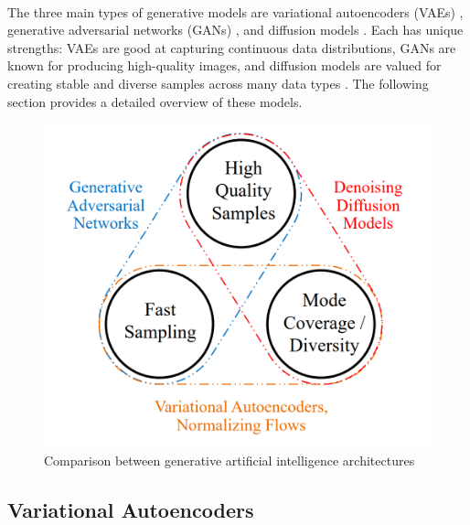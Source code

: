 \\
The three main types of generative models are variational autoencoders (VAEs) \cite{kingmaAutoEncodingVariationalBayes2013}, generative adversarial networks (GANs) \cite{goodfellowGenerativeAdversarialNetworks2014}, and diffusion models \cite{sohl-dicksteinDeepUnsupervisedLearning2015}. Each has unique strengths: VAEs are good at capturing continuous data distributions, GANs are known for producing high-quality images, and diffusion models are valued for creating stable and diverse samples across many data types \cite{xiaoTacklingGenerativeLearning2022}. The following section provides a detailed overview of these models.

\begin{figure} [h]
    \centering
    \includegraphics[width=0.35 \linewidth]{Figures/1-intro/GenAI_comparison.png}
    \caption{Comparison between generative artificial intelligence architectures \cite{xiaoTacklingGenerativeLearning2022}}
    \label{fig:GenAI_comparison}
\end{figure}

\subsection{Variational Autoencoders}

